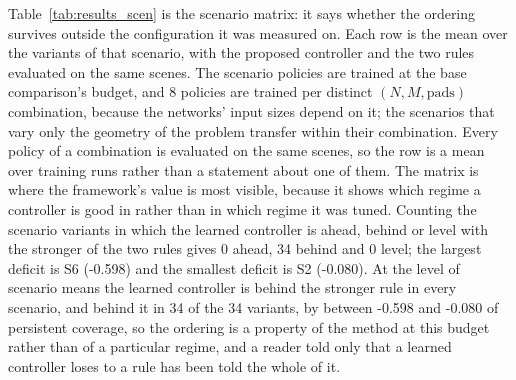 Table~\ref{tab:results_scen} is the scenario matrix: it says whether the ordering survives outside the configuration it was measured on. Each row is the mean over the variants of that scenario, with the proposed
controller and the two rules evaluated on the same scenes.  The scenario
policies are trained at the base comparison's budget, and
8 policies are trained per distinct $(N, M, \text{pads})$ combination, because
the networks' input sizes depend on it; the scenarios that vary only the
geometry of the problem transfer within their combination.  Every policy
of a combination is evaluated on the same scenes, so the row is a mean
over training runs rather than a statement about one of them.  The matrix is
where the framework's value is most visible, because it shows
which regime a controller is good in rather than in which regime it was
tuned.  Counting the scenario variants in which the learned controller is
ahead, behind or level with the stronger of the two rules gives
0 ahead,
34 behind and 0 level; the largest deficit is
S6 (-0.598) and the smallest deficit is S2 (-0.080).  At the level of scenario means the learned controller is behind the stronger rule in every scenario, and behind it in 34 of the 34 variants, by between -0.598 and -0.080 of persistent coverage, so the ordering is a property of the method at this budget rather than of a particular regime, and a reader told only that a learned controller loses to a rule has been told the whole of it.
